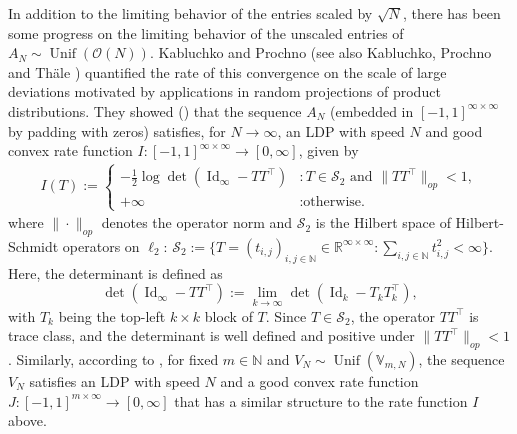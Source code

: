 \documentclass[11pt,a4paper,twoside]{article}
\newcommand{\V}{\mathbb V}
\newcommand{\N}{\mathbb N}
\renewcommand{\O}{\mathcal O}
\DeclareMathOperator{\Unif}{Unif}
\theoremstyle{definition}
\begin{document}
    In addition to the limiting behavior of the entries scaled by $\sqrt{N}$, there has been some progress on the limiting behavior of the unscaled entries of $A_N\sim \Unif(\O(N))$. Kabluchko and Prochno \cite{KabluchkoLarge} (see also Kabluchko, Prochno and Thäle \cite{kabluchko2021new}) quantified the rate of this convergence on the scale of large deviations motivated by applications in random projections of product distributions. They showed (\cite[Theorem B]{KabluchkoLarge}) that the sequence $A_N$ (embedded in \([-1,1]^{\infty\times\infty}\) by padding with zeros) satisfies, for $N\to\infty$, an LDP with speed $N$ and good convex rate function $I:[-1,1]^{\infty\times\infty}\to [0,\infty]$, given by
	\begin{align}\label{ratefunctionorthogonal}
		I(T):= \begin{cases}
			-\frac{1}{2} \log \det \left(\operatorname{Id}_\infty - T T^\top\right) & : T \in \mathscr{S}_2 \text{ and } \|T T^\top\|_{op} < 1, \\
			+\infty & : \text{otherwise.}
		\end{cases}
	\end{align}
	where $\|\cdot\|_{op}$ denotes the operator norm and $\mathscr{S}_2$ is the Hilbert space of Hilbert-Schmidt operators on $\ell_2$: $\mathscr{S}_2 := \{T = (t_{i,j})_{i,j \in \mathbb{N}} \in \mathbb{R}^{\infty \times \infty} : \sum_{i,j \in \mathbb{N}} t_{i,j}^2 < \infty \}$. Here, the determinant is defined as 
  $$
  \det \left(\operatorname{Id}_\infty - T T^\top\right) := \lim_{k \to \infty} \det \left(\operatorname{Id}_k - T_k T_k^\top\right),
  $$
  with $T_k$ being the top-left $k\times k$ block of $T$. Since $T\in\mathscr{S}_2$, the operator $TT^\top$ is trace class, and the determinant is well defined and positive under $\|TT^\top\|_{op}<1$. Similarly, according to \cite[Theorem A]{KabluchkoLarge}, for fixed $m\in\N$ and $V_N \sim \Unif(\V_{m,N})$, the sequence $V_N$ satisfies an LDP with speed $N$ and a good convex rate function $J:[-1,1]^{m\times\infty}\to [0,\infty]$ that has a similar structure to the rate function $I$ above. \\
\end{document}
